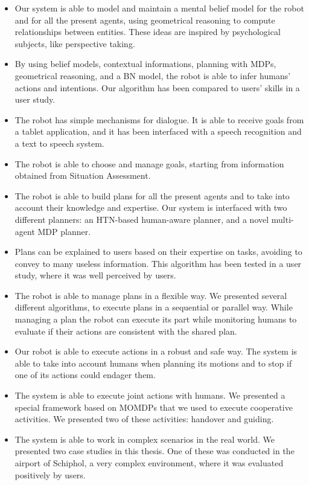 \begin{itemize}
\item Our system is able to model and maintain a mental belief model for the robot and for all the present agents, using geometrical reasoning to compute relationships between entities. These ideas are inspired by psychological subjects, like perspective taking.
\item By using belief models, contextual informations, planning with MDPs,  geometrical reasoning, and a BN model, the robot is able to infer humans' actions and intentions. Our algorithm has been compared to users' skills in a user study.
\item The robot has simple mechanisms for dialogue. It is able to receive goals from a tablet application, and it has been interfaced with a speech recognition and a text to speech system.
\item The robot is able to choose and manage goals, starting from information obtained from Situation Assessment.
\item The robot is able to build plans for all the present agents and to take into account their knowledge and expertise. Our system is interfaced with two different planners: an HTN-based human-aware planner, and a novel multi-agent MDP planner.
\item Plans can be explained to users based on their expertise on tasks, avoiding to convey to many useless information. This algorithm has been tested in a user study, where it was well perceived by users.
\item The robot is able to manage plans in a flexible way. We presented several different algorithms, to execute plans in a sequential or parallel way. While managing a plan the robot can execute its part while monitoring humans to evaluate if their actions are consistent with the shared plan.
\item Our robot is able to execute actions in a robust and safe way. The system is able to take into account humans when planning its motions and to stop if one of its actions could endager them.
\item The system is able to execute joint actions with humans. We presented a special framework based on MOMDPs that we used to execute cooperative activities. We presented two of these activities: handover and guiding.
\item The system is able to work in complex scenarios in the real world. We presented two case studies in this thesis. One of these was conducted in the airport of Schiphol, a very complex environment, where it was evaluated positively by users.
\end{itemize}


